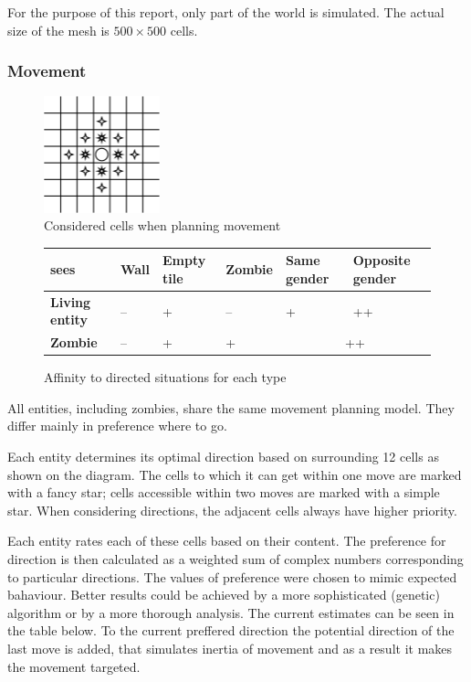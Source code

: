 \documentclass[a4paper]{article}
\begin{document}
For the purpose of this report, only part of the world is simulated.
The actual size of the mesh is $500 \times 500$ cells.

\subsubsection{Movement}

\begin{figure}[ht]
    \centering
    \includegraphics[width=0.3\textwidth]{movement}
    \caption{Considered cells when planning movement}
\end{figure}

\begin{figure}[ht]
    \centering
    \begin{tabu} {| X[1.8,c,p] || X[1,c,p] | X[1,c,p] | X[1,c,p] | X[1,c,p] | X[1.2,c,p] |}
        \rowfont{\bfseries}
        \hline
        sees &
        Wall &
        Empty tile&
        Zombie &
        Same gender &
        Opposite gender \\
        \hline
        \hline
        \textbf{Living entity} & -- & + & -- & + & ++ \\
        \hline
        \textbf{Zombie} & -- & + & + &  \\
        \hline
    \end{tabu}
    \caption{Affinity to directed situations for each type}
\end{figure}

All entities, including zombies, share the same movement planning model.
They differ mainly in preference where to go.

Each entity determines its optimal direction based on surrounding 12 cells as shown on the diagram.
The cells to which it can get within one move are marked with a fancy star; cells accessible within two moves are marked with a simple star.
When considering directions, the adjacent cells always have higher priority.

Each entity rates each of these cells based on their content.
The preference for direction is then calculated as a weighted sum of complex numbers corresponding to particular directions.
The values of preference were chosen to mimic expected bahaviour.
Better results could be achieved by a more sophisticated (genetic) algorithm or by a more thorough analysis.
The current estimates can be seen in the table below.
To the current preffered direction the potential direction of the last move is added, that simulates inertia of movement and as a result it makes the movement targeted.
\end{document}
